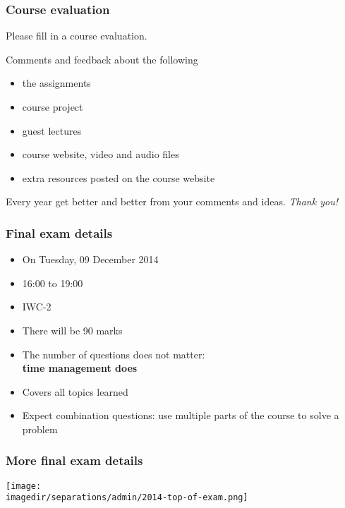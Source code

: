 
\begin{frame}\frametitle{Course evaluation}
	Please fill in a course evaluation.
	
	\vspace{12pt}
	Comments and feedback about the following
	\begin{itemize}
		\item	the assignments
		\item	course project
		\item	guest lectures
		\item	course website, video and audio files
		\item	extra resources posted on the course website
	\end{itemize}
	
	\vspace{12pt}
	{\color{myOrange}Every year get better and better from your comments and ideas. \emph{Thank you!}}
	
\end{frame}


\begin{frame}\frametitle{Final exam details}
	\begin{itemize}
		\item	On Tuesday, 09 December 2014
		\item	16:00 to 19:00
		\item	IWC-2
		\item	There will be 90 marks
		\item	The number of questions does not matter: \\
				{\color{myOrange}\textbf{time management does}}
		\item	Covers all topics learned
		\item	Expect combination questions: use multiple parts of the course to solve a problem
	\end{itemize}
\end{frame}

\begin{frame}\frametitle{More final exam details}
	\texttt{[image: \\imagedir/separations/admin/2014-top-of-exam.png]} 
\end{frame}


